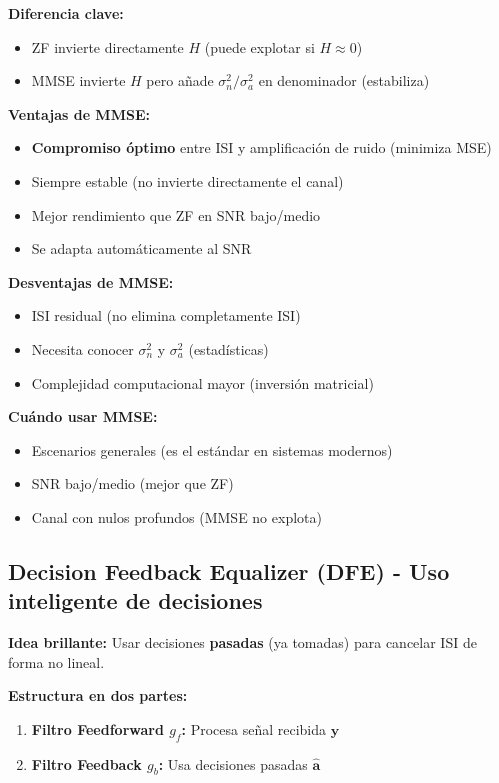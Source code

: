 \documentclass[10pt,a4paper]{article}
\begin{document}
\textbf{Diferencia clave:}
\begin{itemize}
\item ZF invierte directamente $H$ (puede explotar si $H \approx 0$)
\item MMSE invierte $H$ pero añade $\sigma_n^2/\sigma_a^2$ en denominador (estabiliza)
\end{itemize}

\textbf{Ventajas de MMSE:}
\begin{itemize}
\item \textbf{Compromiso óptimo} entre ISI y amplificación de ruido (minimiza MSE)
\item Siempre estable (no invierte directamente el canal)
\item Mejor rendimiento que ZF en SNR bajo/medio
\item Se adapta automáticamente al SNR
\end{itemize}

\textbf{Desventajas de MMSE:}
\begin{itemize}
\item ISI residual (no elimina completamente ISI)
\item Necesita conocer $\sigma_n^2$ y $\sigma_a^2$ (estadísticas)
\item Complejidad computacional mayor (inversión matricial)
\end{itemize}

\textbf{Cuándo usar MMSE:}
\begin{itemize}
\item Escenarios generales (es el estándar en sistemas modernos)
\item SNR bajo/medio (mejor que ZF)
\item Canal con nulos profundos (MMSE no explota)
\end{itemize}

\subsection{Decision Feedback Equalizer (DFE) - Uso inteligente de decisiones}

\textbf{Idea brillante:} Usar decisiones \textbf{pasadas} (ya tomadas) para cancelar ISI de forma no lineal.

\textbf{Estructura en dos partes:}
\begin{enumerate}
\item \textbf{Filtro Feedforward $g_f$:} Procesa señal recibida $\mathbf{y}$
\item \textbf{Filtro Feedback $g_b$:} Usa decisiones pasadas $\hat{\mathbf{a}}$
\end{enumerate}
\end{document}
